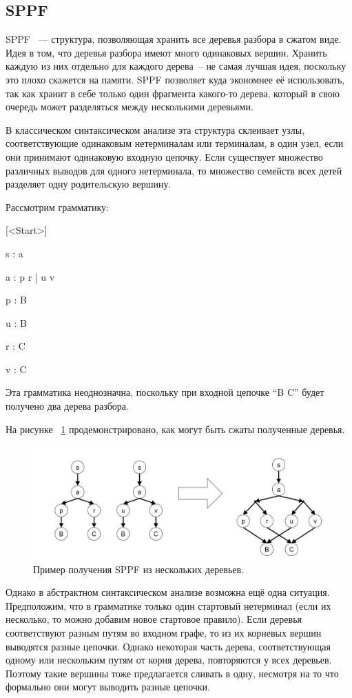 \subsection{SPPF}

SPPF \cite{RNGLR}~--- структура, позволяющая хранить все деревья разбора в сжатом виде. Идея в том, что деревья разбора имеют много одинаковых вершин. Хранить каждую из них отдельно для каждого дерева~-- не самая лучшая идея, поскольку это плохо скажется на памяти. SPPF позволяет куда экономнее её использовать, так как хранит в себе только один фрагмента какого-то дерева, который в свою очередь может разделяться между несколькими деревьями. 

В классическом синтаксическом анализе эта структура склеивает узлы, соответствующие одинаковым нетерминалам или терминалам, в один  узел, если они принимают одинаковую входную цепочку. Если существует множество различных выводов для одного нетерминала, то множество семейств всех детей разделяет одну родительскую вершину. 

Рассмотрим грамматику: 

[<Start>]

s : a 

a : p r | u v

p : B

u : B

r : C

v : C

Эта грамматика неоднозначна, поскольку при входной цепочке “B C” будет получено два дерева разбора. 

На рисунке ~\ref{sppf_idea} продемонстрировано, как могут быть сжаты полученные деревья.

\begin{figure}[h]
\centering
\includegraphics[width=150mm]{Pictures/sppf.png}
\caption{Пример получения SPPF из нескольких деревьев.}
\label{sppf_idea}
\end{figure}

Однако в абстрактном синтаксическом анализе возможна ещё одна ситуация. Предположим, что в грамматике только один стартовый нетерминал (если их несколько, то можно добавим новое стартовое правило). Если деревья соответствуют разным путям во входном графе, то из их корневых вершин выводятся разные цепочки. Однако некоторая часть дерева, соответствующая одному или нескольким путям от корня дерева, повторяются у всех деревьев. Поэтому такие вершины тоже предлагается сливать в одну, несмотря на то что формально они могут выводить разные цепочки. 

